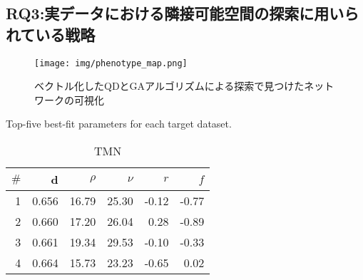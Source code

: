 \documentclass[uplatex,11pt,openany]{ujreport}
\begin{document}
        \subsection{RQ3:実データにおける隣接可能空間の探索に用いられている戦略}

            \begin{figure}[htbp]
                \centering
                \texttt{[image: img/phenotype\_map.png]}
                \caption{ベクトル化したQDとGAアルゴリズムによる探索で見つけたネットワークの可視化}
                \label{fig:phenotype_map}
            \end{figure}

            \begin{landscape}
                \begin{table*}[tb]
                    \caption{Top-five best-fit parameters for each target dataset.}
                    \label{table:best-genes}
                    \begin{subtable}[h]{0.3\textwidth}
                    \centering
                    \caption{TMN}
                    \label{table:best_genes_for_twitter}
                    \begin{tabular}{rrrrrr}
                    \toprule
                    $\#$ & d & $\rho$ & $\nu$ & $r$ & $f$ \\
                    \midrule
                    \color{black} 1 & \color{black} 0.656 & {\cellcolor[HTML]{ADE0B0}} \color[HTML]{000000} \color{black} 16.79 & {\cellcolor[HTML]{9CDAA0}} \color[HTML]{000000} \color{black} 25.30 & {\cellcolor[HTML]{FEC8C8}} \color[HTML]{000000} \color{black} -0.12 & {\cellcolor[HTML]{FFF1F1}} \color[HTML]{000000} \color{black} -0.77 \\
                    \color{black} 2 & \color{black} 0.660 & {\cellcolor[HTML]{AADFAE}} \color[HTML]{000000} \color{black} 17.20 & {\cellcolor[HTML]{9CDAA0}} \color[HTML]{000000} \color{black} 26.04 & {\cellcolor[HTML]{FDB0B0}} \color[HTML]{000000} \color{black} 0.28 & {\cellcolor[HTML]{FFF8F8}} \color[HTML]{000000} \color{black} -0.89 \\
                    \color{black} 3 & \color{black} 0.661 & {\cellcolor[HTML]{9FDBA3}} \color[HTML]{000000} \color{black} 19.34 & {\cellcolor[HTML]{9CDAA0}} \color[HTML]{000000} \color{black} 29.53 & {\cellcolor[HTML]{FEC8C8}} \color[HTML]{000000} \color{black} -0.10 & {\cellcolor[HTML]{FED6D6}} \color[HTML]{000000} \color{black} -0.33 \\
                    \color{black} 4 & \color{black} 0.664 & {\cellcolor[HTML]{B2E2B5}} \color[HTML]{000000} \color{black} 15.73 & {\cellcolor[HTML]{9CDAA0}} \color[HTML]{000000} \color{black} 23.23 & {\cellcolor[HTML]{FEE9E9}} \color[HTML]{000000} \color{black} -0.65 & {\cellcolor[HTML]{FDC0C0}} \color[HTML]{000000} \color{black} 0.02 \\

\end{tabular}
\end{subtable}
\end{table*}
\end{landscape}
\end{document}

